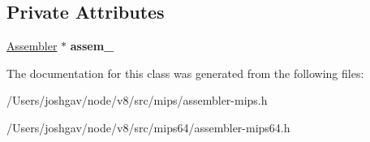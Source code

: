 \subsection*{Private Attributes}
\begin{DoxyCompactItemize}
\item 
\hyperlink{classv8_1_1internal_1_1_assembler}{Assembler} $\ast$ {\bfseries assem\+\_\+}\hypertarget{classv8_1_1internal_1_1_assembler_1_1_block_grow_buffer_scope_a085c0ff07c903762c10c32dcc401ce59}{}\label{classv8_1_1internal_1_1_assembler_1_1_block_grow_buffer_scope_a085c0ff07c903762c10c32dcc401ce59}

\end{DoxyCompactItemize}


The documentation for this class was generated from the following files\+:\begin{DoxyCompactItemize}
\item 
/\+Users/joshgav/node/v8/src/mips/assembler-\/mips.\+h\item 
/\+Users/joshgav/node/v8/src/mips64/assembler-\/mips64.\+h\end{DoxyCompactItemize}
